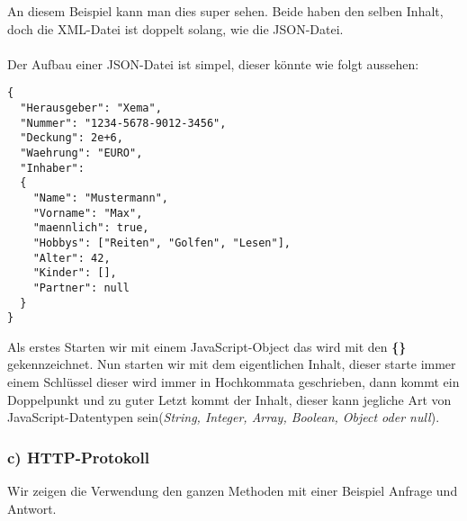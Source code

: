 An diesem Beispiel kann man dies super sehen. Beide haben den selben Inhalt, doch die XML-Datei ist doppelt solang, wie die JSON-Datei. \\\\Der Aufbau einer JSON-Datei ist simpel, dieser könnte wie folgt aussehen:
\begin{lstlisting} 
{
  "Herausgeber": "Xema",
  "Nummer": "1234-5678-9012-3456",
  "Deckung": 2e+6,
  "Waehrung": "EURO",
  "Inhaber":
  {
    "Name": "Mustermann",
    "Vorname": "Max",
    "maennlich": true,
    "Hobbys": ["Reiten", "Golfen", "Lesen"],
    "Alter": 42,
    "Kinder": [],
    "Partner": null
  }
}
\end{lstlisting} 
Als erstes Starten wir mit einem JavaScript-Object das wird mit den \textbf{\{\}} gekennzeichnet. Nun starten wir mit dem eigentlichen Inhalt, dieser starte immer einem Schlüssel dieser wird immer in Hochkommata geschrieben, dann kommt ein Doppelpunkt und zu guter Letzt kommt der Inhalt, dieser kann jegliche Art von JavaScript-Datentypen sein(\textit{String, Integer, Array, Boolean, Object oder null}).
\newpage
\subsubsection{c) HTTP-Protokoll}
Wir zeigen die Verwendung den ganzen Methoden mit einer Beispiel Anfrage und Antwort.\\\\

